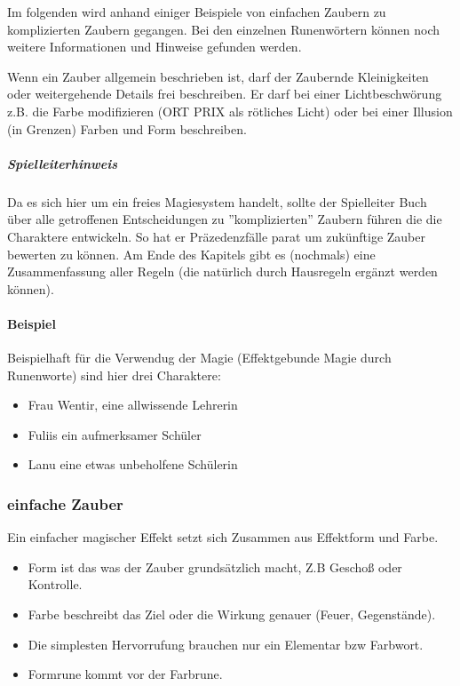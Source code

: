 \documentclass{article}
\begin{document}
Im folgenden wird anhand einiger Beispiele von einfachen Zaubern zu komplizierten Zaubern gegangen. Bei den
einzelnen Runenwörtern können noch weitere Informationen und Hinweise gefunden werden.

Wenn ein Zauber allgemein beschrieben ist, darf der Zaubernde Kleinigkeiten oder weitergehende Details frei beschreiben.
Er darf bei einer Lichtbeschwörung z.B. die Farbe modifizieren (ORT PRIX als rötliches Licht) oder bei einer Illusion
(in Grenzen) Farben und Form beschreiben.

\begin{mdframed}[hidealllines=true, backgroundcolor=black!10]
\subparagraph{Spielleiterhinweis}

Da es sich hier um ein freies Magiesystem handelt, sollte der Spielleiter Buch über alle getroffenen Entscheidungen
zu ''komplizierten'' Zaubern führen die die Charaktere entwickeln. So hat er Präzedenzfälle parat um zukünftige
Zauber bewerten zu können. Am Ende des Kapitels gibt es (nochmals) eine Zusammenfassung aller Regeln (die natürlich
durch Hausregeln ergänzt werden können).

\end{mdframed}
\paragraph{Beispiel}

Beispielhaft für die Verwendug der Magie (Effektgebunde Magie durch Runenworte) sind hier drei Charaktere:
\begin{itemize}
\item Frau Wentir,  eine allwissende Lehrerin
\item Fuliis ein aufmerksamer Schüler
\item Lanu eine etwas unbeholfene Schülerin
\end{itemize}

\subsubsection{einfache Zauber}

Ein einfacher magischer Effekt setzt sich Zusammen aus Effektform und Farbe.

\begin{itemize}
\item Form ist das was der Zauber grundsätzlich macht, Z.B Geschoß oder Kontrolle.
\item Farbe beschreibt das Ziel oder die Wirkung genauer (Feuer, Gegenstände).
\item Die simplesten Hervorrufung brauchen nur ein Elementar bzw Farbwort.
\item Formrune kommt vor der Farbrune.
\end{itemize}
\end{document}
